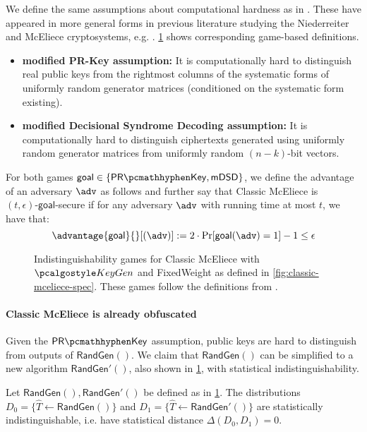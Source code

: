 We define the same assumptions about computational hardness as in \cite[Definition~K.1]{EC:Xagawa22}. These have appeared in more general forms in previous literature studying the Niederreiter and McEliece cryptosystems, e.g. \cite{AC:CouFinSen01,EC:SaiXagYam18}. \cref{fig:classic-mceliece-assumptions} shows corresponding game-based definitions.
\begin{itemize}
    \item \textbf{modified PR-Key assumption:} It is computationally hard to distinguish real public keys from the rightmost columns of the systematic forms of uniformly random generator matrices (conditioned on the systematic form existing).
    \item \textbf{modified Decisional Syndrome Decoding assumption:} It is computationally hard to distinguish ciphertexts generated using uniformly random generator matrices from uniformly random $(n-k)$-bit vectors.
\end{itemize}

For both games $\textsf{goal} \in \{\prkey, \mdsd\}$, we define the advantage of an adversary $\adv$ as follows and further say that Classic McEliece is $(t, \epsilon)\textsf{-goal}$-secure if for any adversary $\adv$ with running time at most $t$, we have that:
\[ \advantage{\textsf{goal}}{}[(\adv)] := 2 \cdot \Pr[\textsf{goal}(\adv) = 1] - 1 \leq \epsilon \]

\begin{figure}
    
    \caption{Indistinguishability games for Classic McEliece with $\kgen$ and \textsf{FixedWeight} as defined in \cref{fig:classic-mceliece-spec}. These games follow the definitions from \cite[Definition~K.1]{EC:Xagawa22}.}
    \label{fig:classic-mceliece-assumptions}
\end{figure}

\paragraph{Classic McEliece is already obfuscated}

Given the $\prkey$ assumption, public keys are hard to distinguish from outputs of $\textsf{RandGen}()$. We claim that $\textsf{RandGen}()$ can be simplified to a new algorithm $\textsf{RandGen}'()$, also shown in \cref{fig:classic-mceliece-assumptions}, with statistical indistinguishability.

\begin{lemma} \label{lem:classic-mceliece-randgen-prime}
    Let $\textsf{RandGen}(), \textsf{RandGen}'()$ be defined as in \cref{fig:classic-mceliece-assumptions}.
    The distributions $D_0 = \{ \hat T \gets \textsf{RandGen}() \}$ and $D_1 = \{ \hat T \gets \textsf{RandGen}'() \}$ are statistically indistinguishable, i.e. have statistical distance $\Delta(D_0, D_1) = 0$.
\end{lemma}

